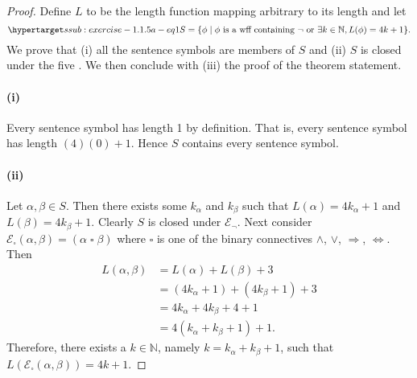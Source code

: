 \documentclass{report}
\begin{document}
  \begin{proof}

    Define $L$ to be the length function mapping arbitrary
       to its length and let
      \begin{equation}
        \hyperlabel{ssub:exercise-1.1.5a-eq1}
        S = \{\phi \mid
          \phi \text{ is a wff containing } \neg \text{ or }
          \exists k \in \mathbb{N}, L(\phi) = 4k + 1\}.
      \end{equation}
    We prove that (i) all the sentence symbols are members of $S$ and (ii)
      $S$ is closed under the five .
    We then conclude with (iii) the proof of the theorem statement.

    \paragraph{(i)}%

      Every sentence symbol has length 1 by definition.
      That is, every sentence symbol has length $(4)(0) + 1$.
      Hence $S$ contains every sentence symbol.

    \paragraph{(ii)}%

      Let $\alpha, \beta \in S$.
      Then there exists some $k_\alpha$ and $k_\beta$ such that
        $L(\alpha) = 4k_\alpha + 1$ and $L(\beta) = 4k_\beta + 1$.
      Clearly $S$ is closed under $\mathcal{E}_{\neg}$.
      Next consider
        $\mathcal{E}_{\square}(\alpha, \beta) = (\alpha \mathop{\square} \beta)$
        where $\square$ is one of the binary connectives $\land$, $\lor$,
          $\Rightarrow$, $\Leftrightarrow$.
      Then
        \begin{align*}
          L(\alpha, \beta)
            & = L(\alpha) + L(\beta) + 3 \\
            & = (4k_\alpha + 1) + (4k_\beta + 1) + 3 \\
            & = 4k_\alpha + 4k_\beta + 4 + 1 \\
            & = 4(k_\alpha + k_\beta + 1) + 1.
        \end{align*}
      Therefore, there exists a $k \in \mathbb{N}$, namely
        $k = k_\alpha + k_\beta + 1$, such that
        $L(\mathcal{E}_{\square}(\alpha, \beta)) = 4k + 1$.


\end{proof}
\end{document}
